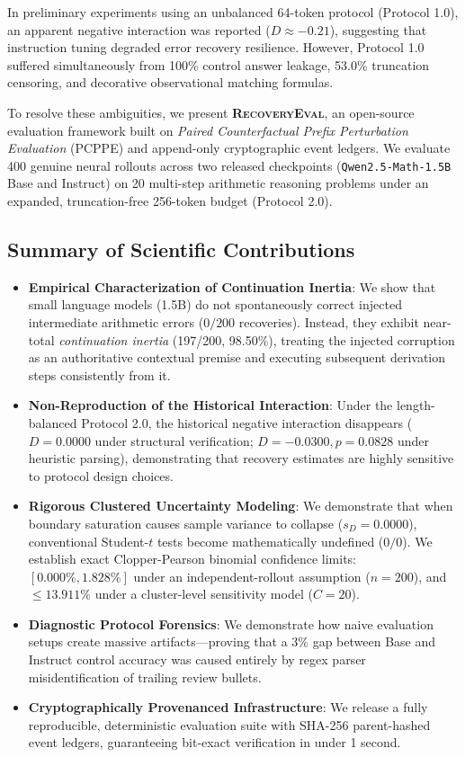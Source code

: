 \documentclass[11pt,letterpaper]{article}
\newcommand{\modelbase}{\texttt{Qwen2.5-Math-1.5B}}
\newcommand{\framework}{\textsc{RecoveryEval}}
\begin{document}
In preliminary experiments using an unbalanced 64-token protocol (Protocol 1.0), an apparent negative interaction was reported ($D \approx -0.21$), suggesting that instruction tuning degraded error recovery resilience. However, Protocol 1.0 suffered simultaneously from 100\% control answer leakage, 53.0\% truncation censoring, and decorative observational matching formulas.

To resolve these ambiguities, we present \textbf{\framework}, an open-source evaluation framework built on \textit{Paired Counterfactual Prefix Perturbation Evaluation} (PCPPE) and append-only cryptographic event ledgers. We evaluate 400 genuine neural rollouts across two released checkpoints (\modelbase{} Base and Instruct) on 20 multi-step arithmetic reasoning problems under an expanded, truncation-free 256-token budget (Protocol 2.0).

\subsection{Summary of Scientific Contributions}
\begin{itemize}[leftmargin=*]
    \item \textbf{Empirical Characterization of Continuation Inertia}: We show that small language models (1.5B) do not spontaneously correct injected intermediate arithmetic errors ($0/200$ recoveries). Instead, they exhibit near-total \textit{continuation inertia} (197/200, 98.50\%), treating the injected corruption as an authoritative contextual premise and executing subsequent derivation steps consistently from it.
    \item \textbf{Non-Reproduction of the Historical Interaction}: Under the length-balanced Protocol 2.0, the historical negative interaction disappears ($D = 0.0000$ under structural verification; $D = -0.0300, p = 0.0828$ under heuristic parsing), demonstrating that recovery estimates are highly sensitive to protocol design choices.
    \item \textbf{Rigorous Clustered Uncertainty Modeling}: We demonstrate that when boundary saturation causes sample variance to collapse ($s_D = 0.0000$), conventional Student-$t$ tests become mathematically undefined ($0/0$). We establish exact Clopper-Pearson binomial confidence limits: $[0.000\%, 1.828\%]$ under an independent-rollout assumption ($n=200$), and $\le 13.911\%$ under a cluster-level sensitivity model ($C=20$).
    \item \textbf{Diagnostic Protocol Forensics}: We demonstrate how naive evaluation setups create massive artifacts—proving that a 3\% gap between Base and Instruct control accuracy was caused entirely by regex parser misidentification of trailing review bullets.
    \item \textbf{Cryptographically Provenanced Infrastructure}: We release a fully reproducible, deterministic evaluation suite with SHA-256 parent-hashed event ledgers, guaranteeing bit-exact verification in under 1 second.
\end{itemize}
\end{document}
